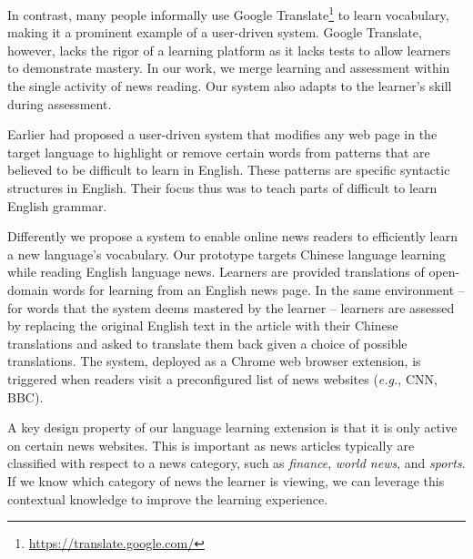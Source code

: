 In contrast, many people informally use Google
Translate\footnote{\url{https://translate.google.com/}} to learn
vocabulary, making it a prominent example of a user-driven system.
Google Translate, however, lacks the rigor of a learning platform as it lacks
tests to allow learners to demonstrate mastery.  In our work, we merge
learning and assessment within the single activity of news reading.
Our system also adapts to the learner's skill during assessment.

Earlier \cite{meurers2010} had proposed a user-driven system that modifies 
any web page in the target language to highlight or remove certain words 
from patterns that are believed to be difficult to learn in English. These 
patterns are specific syntactic structures in English. Their focus thus was 
to teach parts of difficult to learn English grammar.

Differently we propose a system to enable online news readers to efficiently 
learn a new language's vocabulary. Our prototype targets Chinese language 
learning while reading English language news. Learners are provided translations 
of open-domain words for learning from an English news page. In the same
environment -- for words that the system deems mastered by the learner
-- learners are assessed by replacing the original English text in the
article with their Chinese translations and asked to translate them
back given a choice of possible translations.  The system, deployed as
a Chrome web browser extension, is triggered when readers visit a
preconfigured list of news websites ({\it e.g.}, CNN, BBC).

A key design property of our language learning extension is that it is only
active on certain news websites.  This is important as news articles
typically are classified with respect to a news category, such as {\it
  finance}, {\it world news}, and {\it sports}. If we know which
category of news the learner is viewing, we can leverage this
contextual knowledge to improve the learning experience.

